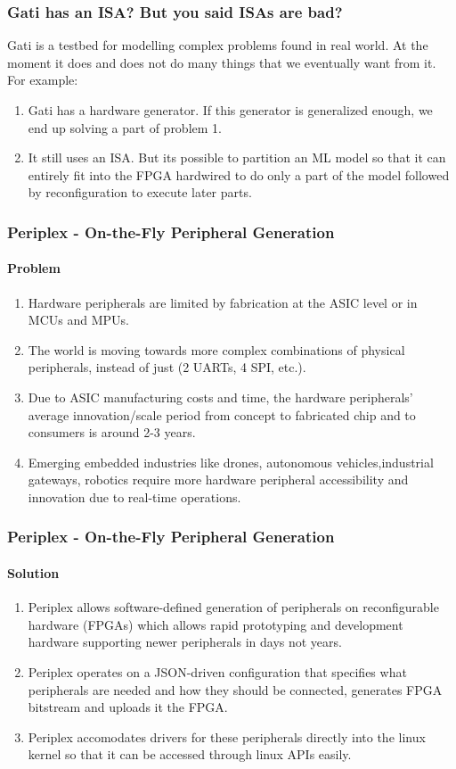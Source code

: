 \documentclass{beamer}
\begin{document}
{\begin{frame}[fragile]
  \frametitle{Gati has an ISA? But you said ISAs are bad?}
  Gati is a testbed for modelling complex problems found in real world.
  At the moment it does and does not do many things that we eventually want
  from it.
  For example:
  \begin{enumerate}
    \item Gati has a hardware generator. If this generator is generalized
      enough, we end up solving a part of problem 1.
    \item It still uses an ISA. But its possible to partition an ML
      model so that it can entirely fit into 
      the FPGA hardwired to do only a part of the model followed by
      reconfiguration to execute later parts.
  \end{enumerate}
\end{frame}

\begin{frame}[fragile]
  \frametitle{Periplex - On-the-Fly Peripheral Generation}
  \framesubtitle{Problem}
  \begin{enumerate}
    \item Hardware peripherals are limited by fabrication at the ASIC level or
      in MCUs and MPUs.
    \item The world is moving towards more complex combinations of physical
      peripherals, instead of just (2 UARTs, 4 SPI, etc.).
    \item Due to ASIC manufacturing costs and time, the hardware peripherals’
      average innovation/scale period from concept to fabricated chip and to
      consumers is around 2-3 years.
    \item Emerging embedded industries like drones, autonomous
  vehicles,industrial gateways, robotics require more hardware peripheral
  accessibility and innovation due to real-time operations.
  \end{enumerate}
\end{frame}


\begin{frame}[fragile]
  \frametitle{Periplex - On-the-Fly Peripheral Generation}
  \framesubtitle{Solution}
  \begin{enumerate}
    \item Periplex allows software-defined generation of peripherals on
      reconfigurable hardware (FPGAs) which allows rapid prototyping
      and development hardware supporting newer peripherals in days not years.
    \item Periplex operates on a JSON-driven configuration that specifies 
      what peripherals are needed and how they should be connected, 
      generates FPGA bitstream and uploads it the FPGA.
    \item Periplex accomodates drivers for these peripherals directly into
      the linux kernel so that it can be accessed through linux APIs easily.
  \end{enumerate}
\end{frame}

}
\end{document}
